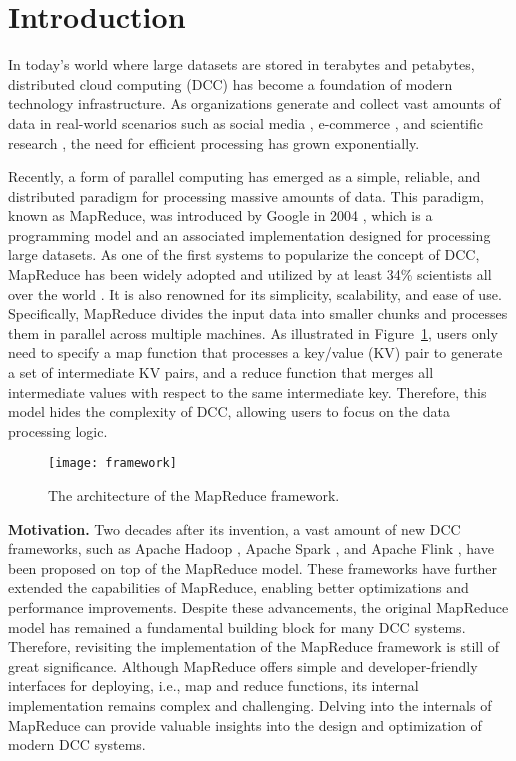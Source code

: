 \section{Introduction}
\label{sec:introduction}

In today's world where large datasets are stored in
terabytes and petabytes, distributed cloud computing (DCC) has become a foundation of modern technology infrastructure. As organizations generate and collect vast amounts of data in real-world scenarios such as social media \cite{ali2013cloud}, e-commerce \cite{wang2013influences}, and scientific research \cite{gunarathne2010mapreduce}, the need for efficient processing has grown exponentially. 

Recently, a form of parallel computing has emerged as a simple, reliable, and distributed paradigm for processing massive amounts of data. This paradigm, known as MapReduce, was introduced by Google in 2004 \cite{dean2008mapreduce}, which is a programming model and an associated implementation designed for processing large datasets. As one of the first systems to popularize the concept of DCC, MapReduce has been widely adopted and utilized by at least 34\% scientists all over the world \cite{kim2017data}. It is also renowned for its simplicity, scalability, and ease of use. Specifically, MapReduce divides the input data into smaller chunks and processes them in parallel across multiple machines. As illustrated in Figure~\ref{fig:mapreduce-framework}, users only need to specify a map function that processes a key/value (KV) pair to generate a set of intermediate KV pairs, and a reduce function that merges all intermediate values with respect to the same intermediate key. Therefore, this model hides the complexity of DCC, allowing users to focus on the data processing logic.

\begin{figure}
    \centering
    \texttt{[image: framework]}
    \caption{The architecture of the MapReduce framework.}
    \label{fig:mapreduce-framework}
\end{figure}

\noindent\textbf{Motivation.} Two decades after its invention, a vast amount of new DCC frameworks, such as Apache Hadoop \cite{white2012hadoop}, Apache Spark \cite{zaharia2016apache}, and Apache Flink \cite{katsifodimos2016apache}, have been proposed on top of the MapReduce model. These frameworks have further extended the capabilities of MapReduce, enabling better optimizations and performance improvements. Despite these advancements, the original MapReduce model has remained a fundamental building block for many DCC systems. Therefore, revisiting the implementation of the MapReduce framework is still of great significance. Although MapReduce offers simple and developer-friendly interfaces for deploying, i.e., map and reduce functions, its internal implementation remains complex and challenging. Delving into the internals of MapReduce can provide valuable insights into the design and optimization of modern DCC systems.

